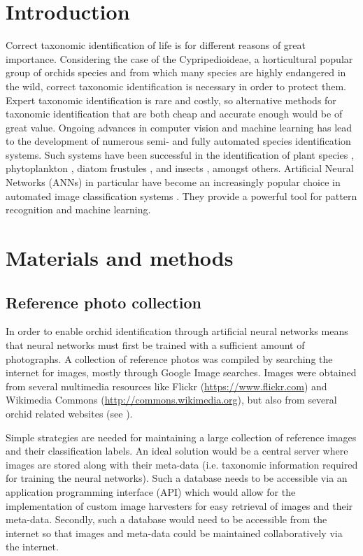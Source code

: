 \documentclass[3p,twocolumn,10pt]{elsarticle}
\begin{document}
\section{Introduction}
\label{sec:introduction}

Correct taxonomic identification of life is for different reasons of great importance. Considering the case of the Cypripedioideae, a horticultural popular group of orchids species and from which many species are highly endangered in the wild, correct taxonomic identification is necessary in order to protect them. Expert taxonomic identification is rare and costly, so alternative methods for taxonomic identification that are both cheap and accurate enough would be of great value. Ongoing advances in computer vision and machine learning has lead to the development of numerous semi- and fully automated species identification systems. Such systems have been successful in the identification of plant species \citep{Arinkin2014, Nilsback2008, Sanz2013}, phytoplankton \citep{Boddy1994}, diatom frustules \citep{Kloster2014}, and insects \citep{Weeks1999,Kang2012}, amongst others. Artificial Neural Networks (ANNs) in particular have become an increasingly popular choice in automated image classification systems \citep{Weeks1997}. They provide a powerful tool for pattern recognition and machine learning.

\section{Materials and methods}
\label{sec:methods}


\subsection{Reference photo collection}

In order to enable orchid identification through artificial neural networks means that neural networks must first be trained with a sufficient amount of photographs. A collection of reference photos was compiled by searching the internet for images, mostly through Google Image searches. Images were obtained from several multimedia resources like Flickr (\url{https://www.flickr.com}) and Wikimedia Commons (\url{http://commons.wikimedia.org}), but also from several orchid related websites (see ).

Simple strategies are needed for maintaining a large collection of reference images and their classification labels. An ideal solution would be a central server where images are stored along with their meta-data (i.e. taxonomic information required for training the neural networks). Such a database needs to be accessible via an application programming interface (API) which would allow for the implementation of custom image harvesters for easy retrieval of images and their meta-data. Secondly, such a database would need to be accessible from the internet so that images and meta-data could be maintained collaboratively via the internet.
\end{document}
